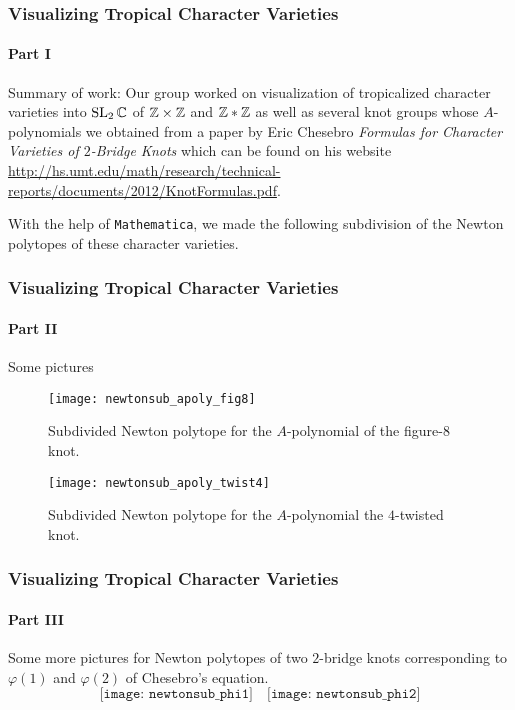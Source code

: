 \begin{frame}
  \frametitle{Visualizing Tropical Character Varieties}
  \framesubtitle{Part I}%
  Summary of work: Our group worked on visualization of tropicalized
  character varieties into $\operatorname{SL}_2\mathbb{C}$ of $\mathbb{Z}\times\mathbb{Z}$ and $\mathbb{Z}*\mathbb{Z}$
  as well as several knot groups whose $A$-polynomials we obtained from a
  paper by Eric Chesebro \emph{Formulas for Character Varieties of
    $2$-Bridge Knots} which can be found on his website
  \url{http://hs.umt.edu/math/research/technical-reports/documents/2012/KnotFormulas.pdf}.

  With the help of \texttt{Mathematica}, we made the following subdivision
  of the Newton polytopes of these character varieties.
\end{frame}

\begin{frame}
  \frametitle{Visualizing Tropical Character Varieties}
  \framesubtitle{Part II}
  Some pictures
  \begin{figure}
    \texttt{[image: newtonsub\_apoly\_fig8]}
    \caption{Subdivided Newton polytope for the $A$-polynomial of the
      figure-$8$ knot.}
  \end{figure}
\end{frame}
\begin{frame}
  \begin{figure}
    \texttt{[image: newtonsub\_apoly\_twist4]}
    \caption{Subdivided Newton polytope for the $A$-polynomial the
      $4$-twisted knot.}
  \end{figure}
\end{frame}

\begin{frame}
  \frametitle{Visualizing Tropical Character Varieties}
  \framesubtitle{Part III} Some more pictures for Newton polytopes of two
  $2$-bridge knots corresponding to $\varphi(1)$ and $\varphi(2)$ of
  Chesebro's equation.
  \[
    \texttt{[image: newtonsub\_phi1]}
    \quad
    \texttt{[image: newtonsub\_phi2]}
  \]
\end{frame}

